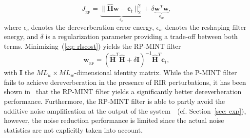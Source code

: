 \documentclass{aes60i}
\begin{document}
\begin{equation}
  \label{eq: rlscost}
  J_{_{\text{RP}}} =  \underbrace{\| \hat{\mathbf{H}}\mathbf{w} - \mathbf{c}_t \|_2^2}_{\epsilon_{{c}}} + \delta \underbrace{ \mathbf{w}^T \mathbf{w} }_{\epsilon_w},
\end{equation}
where $\epsilon_{{c}}$ denotes the dereverberation error energy, $\epsilon_{w}$ denotes the reshaping filter energy, and $\delta$ is a regularization parameter providing a trade-off between both terms.
Minimizing~(\ref{eq: rlscost}) yields the RP-MINT filter
\begin{equation}
\label{eq: w_rpmint}
\mathbf{w}_{_{\text{RP}}} = (\hat{\mathbf{H}}^T\hat{\mathbf{H}} + \delta \mathbf{I})^{-1}\hat{\mathbf{H}}^T\mathbf{c}_t,
\end{equation}
with $\mathbf{I}$ the $ML_w \times ML_w$-dimensional identity matrix. 
While the P-MINT filter fails to achieve dereverberation in the presence of RIR perturbations, it has been shown in~\cite{Kodrasi_ITASLP_2013} that the RP-MINT filter yields a significantly better dereverberation performance.
Furthermore, the RP-MINT filter is able to partly avoid the additive noise amplification at the output of the system~\cite{Kodrasi_ITASLP_2013}~(cf. Section~\ref{sec: exp}), however, the noise reduction performance is limited since the actual noise statistics are not explicitly taken into account. 
\end{document}
